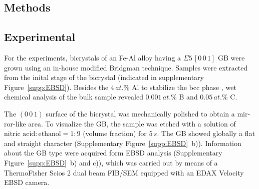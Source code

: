 \documentclass[12pt,a4paper,twoside,twocolumn,english,english]{article}
\begin{document}
\begin{otherlanguage}{english}
\section*{Methods}
\subsection*{Experimental}
For the experiments, bicrystals of an Fe-Al alloy having a $\Sigma 5\,[0\,0\,1]$ GB were grown using an in-house modified Bridgman technique. Samples were extracted from the inital stage of the bicrystal (indicated in supplementary Figure~\ref{supp:EBSD}). Besides the $4\, at.\%$ Al to stabilize the bcc phase \cite{kubaschewski_ironbinary_2013}, wet chemical analysis of the bulk sample revealed $0.001\,at.\%$ B and $0.05\,at.\%$ C.

%




The $(0\,0\,1)$ surface of the bicrystal was mechanically polished to obtain a mirror-like area. To visualize the GB, the sample was etched with a solution of $\text{nitric acid}:\text{ethanol} =1:9$ (volume fraction) for $5\,s$. 
The GB showed globally a flat and straight character (Supplementary Figure~\ref{supp:EBSD}~b)). Information about the GB type were acquired form EBSD analysis (Supplementary Figure~\ref{supp:EBSD}~b) and c)), which was carried out by means of a ThermoFisher Scios 2 dual beam FIB/SEM equipped with an EDAX Velocity EBSD camera. 


\end{otherlanguage}
\end{document}
